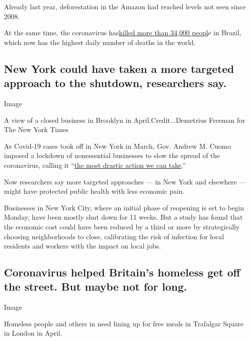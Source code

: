 Already last year, deforestation in the Amazon had reached levels not
seen since 2008.

At the same time, the coronavirus
has\href{https://covid.saude.gov.br/}{killed more than 34,000 peopl}e in
Brazil, which now has the highest daily number of deaths in the world.

\hypertarget{new-york-could-have-taken-a-more-targeted-approach-to-the-shutdown-researchers-say}{%
\subsection{New York could have taken a more targeted approach to the
shutdown, researchers
say.}\label{new-york-could-have-taken-a-more-targeted-approach-to-the-shutdown-researchers-say}}

Image

A view of a closed business in Brooklyn in April.Credit...Demetrius
Freeman for The New York Times

As Covid-19 cases took off in New York in March, Gov. Andrew M. Cuomo
imposed a lockdown of nonessential businesses to slow the spread of the
coronavirus, calling it
``\href{https://www.nytimes3xbfgragh.onion/2020/03/20/us/ny-ca-stay-home-order.html}{the
most drastic action we can take}.''

Now researchers say more targeted approaches --- in New York and
elsewhere --- might have protected public health with less economic
pain.

Businesses in New York City, where an initial phase of reopening is set
to begin Monday, have been mostly shut down for 11 weeks. But a study
has found that the economic cost could have been reduced by a third or
more by strategically choosing neighborhoods to close, calibrating the
risk of infection for local residents and workers with the impact on
local jobs.

\hypertarget{coronavirus-helped-britains-homeless-get-off-the-street-but-maybe-not-for-long}{%
\subsection{Coronavirus helped Britain's homeless get off the street.
But maybe not for
long.}\label{coronavirus-helped-britains-homeless-get-off-the-street-but-maybe-not-for-long}}

Image

Homeless people and others in need lining up for free meals in Trafalgar
Square in London in April.

